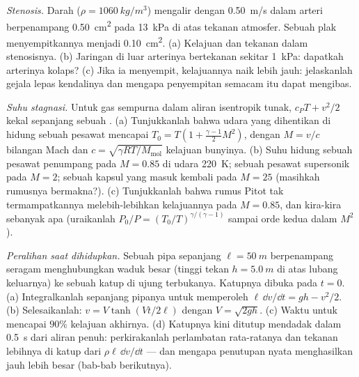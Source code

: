 \begin{exercise}[$\star\star$]\label{exo:b2:euler-bernoulli:9}
\emph{Stenosis.} Darah ($\rho = \qty{1060}{kg/m^3}$) mengalir dengan \qty{0.50}{m/s}
dalam arteri berpenampang \qty{0.50}{cm^2} pada \qty{13}{kPa} di atas tekanan
atmosfer. Sebuah plak menyempitkannya menjadi \qty{0.10}{cm^2}. (a) Kelajuan dan tekanan
dalam stenosisnya. (b) Jaringan di luar arterinya bertekanan sekitar
\qty{1}{kPa}: dapatkah arterinya kolaps? (c) Jika ia menyempit, kelajuannya
naik lebih jauh: jelaskanlah gejala lepas kendalinya dan mengapa penyempitan semacam itu dapat mengibas.
\end{exercise}

\begin{exercise}[$\star\star\star$]\label{exo:b2:euler-bernoulli:10}
\emph{Suhu stagnasi.} Untuk gas sempurna dalam aliran isentropik
tunak, $c_PT + v^2/2$ kekal sepanjang sebuah . (a) Tunjukkanlah bahwa
udara yang dihentikan di hidung sebuah pesawat mencapai $T_0 = T(1 +
\tfrac{\gamma - 1}{2}M^2)$, dengan $M = v/c$ bilangan Mach dan $c =
\sqrt{\gamma RT/M_{\text{mol}}}$ kelajuan bunyinya. (b) Suhu hidung
sebuah pesawat penumpang pada $M = 0.85$ di udara \qty{220}{K}; sebuah pesawat
supersonik pada $M = 2$; sebuah kapsul yang masuk kembali pada $M = 25$ (masihkah rumusnya
bermakna?). (c) Tunjukkanlah bahwa rumus Pitot tak termampatkannya
melebih-lebihkan kelajuannya pada $M = 0.85$, dan kira-kira sebanyak apa (uraikanlah
$P_0/P = (T_0/T)^{\gamma/(\gamma - 1)}$ sampai orde kedua dalam $M^2$).
\end{exercise}

\begin{exercise}[$\star\star\star$]\label{exo:b2:euler-bernoulli:11}
\emph{Peralihan saat dihidupkan.} Sebuah pipa sepanjang $\ell = \qty{50}{m}$ berpenampang
seragam menghubungkan waduk besar (tinggi tekan $h = \qty{5.0}{m}$ di atas
lubang keluarnya) ke sebuah katup di ujung terbukanya. Katupnya dibuka pada $t = 0$. (a)
Integralkanlah  sepanjang pipanya untuk memperoleh $\ell\,\dd v/\dd t = gh - v^2/2$.
(b) Selesaikanlah: $v = V\tanh(Vt/2\ell)$ dengan $V = \sqrt{2gh}$. (c) Waktu untuk
mencapai $90\%$ kelajuan akhirnya. (d) Katupnya kini ditutup mendadak dalam
\qty{0.5}{s} dari aliran penuh: perkirakanlah perlambatan rata-ratanya dan
tekanan lebihnya di katup dari $\rho\ell\,\dd v/\dd t$ --- dan mengapa penutupan
nyata menghasilkan jauh lebih besar (bab-bab berikutnya).
\end{exercise}

